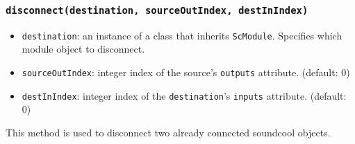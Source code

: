 \documentclass[20pt]{article}
\begin{document}
\subsubsection*{\texttt{disconnect(destination, sourceOutIndex, destInIndex)}}
\begin{itemize}
\item \texttt{destination}: an instance of a class that inherits \texttt{ScModule}. Specifies which module object to disconnect.
\item \texttt{sourceOutIndex}: integer index of the source's \texttt{outputs} attribute. (default: 0)
\item \texttt{destInIndex}: integer index of the \texttt{destination}'s \texttt{inputs} attribute. (default: 0)
\end{itemize}
This method is used to disconnect two already connected soundcool objects.
\end{document}

